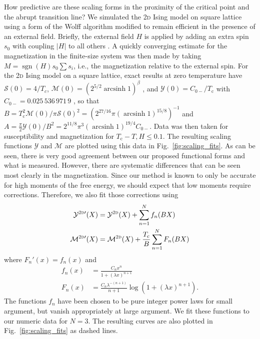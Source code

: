 \documentclass[aps,prl,reprint]{revtex4-1}
\def\[{\begin{equation}}
\def\]{\end{equation}}
\def\arcsinh{\mathop{\mathrm{arcsinh}}\nolimits}
\def\sgn{\mathop{\mathrm{sgn}}\nolimits}
\def\c{\mathrm c}
\def\fM{\mathcal M}  %
\def\fX{\mathcal Y}  %
\def\fS{\mathcal S}  %
\def\twodee{\textsc{2d} }
\begin{document}
How predictive are these scaling forms in the proximity of the critical point
and the abrupt transition line? We simulated the \twodee Ising model on square lattice using a form of the Wolff algorithm modified
to remain efficient in the presence of an external field. Briefly, the external field $H$ is applied by adding an extra spin $s_0$ with coupling $|H|$ to all others
\cite{dimitrovic.1991.finite}. A quickly converging estimate for the magnetization in the finite-size system was then made by taking $M=\sgn(H)s_0\sum s_i$, i.e., the magnetization relative to the external spin. For the \twodee Ising model on a square lattice, exact results at zero temperature have $\fS(0)=4/T_c$, $\fM(0)=(2^{5/2}\arcsinh1)^\beta$ \cite{onsager.1944.crystal}, and $\fX(0)=C_{0-}/T_\c$ with $C_{0-}=0.025\,536\,971\,9$
\cite{barouch.1973.susceptibility}, so that $B=T_\c^2\fM(0)/\pi\fS(0)^2=(2^{27/16}\pi(\arcsinh1)^{15/8})^{-1}$ and $A=\frac\pi2\fX(0)/B^2=2^{11/8}\pi^3(\arcsinh1)^{19/4}C_{0-}$. 
Data was then taken for susceptibility and
magnetization for $T_\c-T,H\leq0.1$. The resulting scaling functions $\fX$ and
$\fM$ are plotted using this data in
Fig.~\ref{fig:scaling_fits}. As can be seen, there is very good agreement
between our proposed functional forms and what is measured.
However, there are systematic differences that can be seen most clearly in the
magnetization. Since our method is known to only be accurate for high moments
of the free energy, we should expect that low moments require corrections.
Therefore, we also fit those corrections using 
\begin{align}
  \fX^{\twodee\prime}(X)&=\fX^\twodee(X)+\sum_{n=1}^Nf_n(BX)\label{eq:sus_scaling_poly}\\
  \fM^{\twodee\prime}(X)&=\fM^\twodee(X)+\frac{T_\c}B\sum_{n=1}^NF_n(BX)\label{eq:mag_scaling_poly}
\end{align}
where $F_n'(x)=f_n(x)$ and
\[
  \begin{aligned}
    f_n(x)&=\frac{C_nx^n}{1+(\lambda x)^{n+1}}\\
    F_n(x)&=\frac{C_n\lambda^{-(n+1)}}{n+1}\log(1+(\lambda x)^{n+1}).
  \end{aligned}
  \label{eq:poly}
\]
The functions $f_n$ have been chosen to be pure integer power laws for small
argument, but vanish appropriately at large argument.
We fit these functions to our numeric data for $N=3$. The resulting curves are
also plotted in Fig.~\ref{fig:scaling_fits} as dashed lines.
\end{document}
